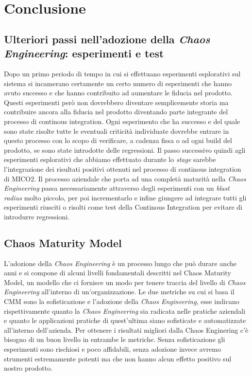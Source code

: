 
\chapter{Conclusione}

\section{Ulteriori passi nell'adozione della \textit{Chaos Engineering}: esperimenti e test}
Dopo un primo periodo di tempo in cui si effettuano esperimenti esplorativi sul sistema si incamerano certamente un certo numero di esperimenti che hanno avuto successo e che hanno contribuito ad aumentare le fiducia nel prodotto.
Questi esperimenti però non dovrebbero diventare semplicemente storia ma contribuire ancora alla fiducia nel prodotto diventando parte integrante del processo di continous integration.
Ogni esperimento che ha successo e del quale sono state risolte tutte le eventuali criticità individuate dovrebbe entrare in questo processo con lo scopo di verificare, a cadenza fissa o ad ogni build del prodotto, se sono state introdotte delle regressioni.
Il passo successivo quindi agli esperimenti esplorativi che abbiamo effettuato durante lo \textit{stage} sarebbe l'integrazione dei risultati positivi ottenuti nel processo di continous integration di MICO2.
Il processo aziendale che porta ad una completà maturità nella \textit{Chaos Engineering} passa necessariamente attraverso degli esperimenti con un \textit{blast radius} molto piccolo, per poi incrementarlo e infine giungere ad integrare tutti gli esperimenti riusciti o risolti come test della Continous Integration per evitare di introdurre regressioni.


\section{Chaos Maturity Model}
L'adozione della \textit{Chaos Engineering} è un processo lungo che può durare anche anni e si compone di alcuni livelli fondamentali descritti nel Chaos Maturity Model, un modello che ci fornisce un modo per tenere traccia del livello di \textit{Chaos Engineering} all'interno di un'organizzazione.
Le due metriche su cui si basa il CMM sono la sofisticazione e l'adozione della \textit{Chaos Engineering}, esse indicano rispettivamente quanto la \textit{Chaos Engineering} sia radicata nelle pratiche aziendali e quanto le applicazioni pratiche di quest'ultima siano sofisticate e automatizzate all'interno dell'azienda.
Per ottenere i risultati migliori dalla Chaos Enginering c'è bisogno di un buon livello in entrambe le metriche.
Senza sofisticazione gli esperimenti sono rischiosi e poco affidabili, senza adozione invece avremo strumenti estremamente potenti ma che non hanno alcun effetto positivo sul nostro prodotto.

